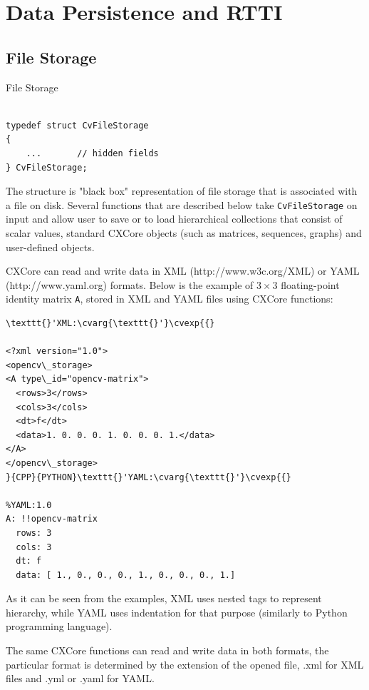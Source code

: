 \section{Data Persistence and RTTI}


\subsection{File Storage}

\label{CvFileStorage}

File Storage

\begin{lstlisting}

typedef struct CvFileStorage
{
    ...       // hidden fields
} CvFileStorage;

\end{lstlisting}

The structure  is "black box" representation
of file storage that is associated with a file on disk. Several
functions that are described below take \texttt{CvFileStorage} on
input and allow user to save or to load hierarchical collections
that consist of scalar values, standard CXCore objects (such as
matrices, sequences, graphs) and user-defined objects.

CXCore can read and write data in XML (http://www.w3c.org/XML) or YAML
(http://www.yaml.org) formats. Below is the example of $3 \times 3$
floating-point identity matrix \texttt{A}, stored in XML and YAML files
using CXCore functions:

\begin{verbatim}
\texttt{}'XML:\cvarg{\texttt{}'}\cvexp{{}

<?xml version="1.0">
<opencv\_storage>
<A type\_id="opencv-matrix">
  <rows>3</rows>
  <cols>3</cols>
  <dt>f</dt>
  <data>1. 0. 0. 0. 1. 0. 0. 0. 1.</data>
</A>
</opencv\_storage>
}{CPP}{PYTHON}\texttt{}'YAML:\cvarg{\texttt{}'}\cvexp{{}

%YAML:1.0
A: !!opencv-matrix
  rows: 3
  cols: 3
  dt: f
  data: [ 1., 0., 0., 0., 1., 0., 0., 0., 1.]
\end{verbatim}

As it can be seen from the examples, XML uses nested tags to represent
hierarchy, while YAML uses indentation for that purpose (similarly
to Python programming language).

The same CXCore functions can read and write data in both formats,
the particular format is determined by the extension of the opened
file, .xml for XML files and .yml or .yaml for YAML.


